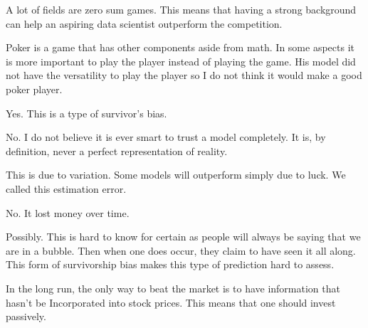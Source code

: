 \documentclass[12pt]{article}
\begin{document}
\begin{enumerate}
A lot of fields are zero sum games. This means that having a  strong background can help an aspiring data scientist outperform the competition. 



Poker is a game that has other components aside from math. In some aspects it is more important to play the player instead of playing the game. His model did not have the versatility to play the player so I do not think it would make a good poker player. 


Yes. This is a type of survivor's bias. 


No. I do not believe it is ever smart to trust a model completely. It is, by definition, never a perfect representation of reality. 


This is due to variation. Some models will outperform simply due to luck. We called this estimation error. 

No. It lost money over time. 

Possibly. This is hard to know for certain as people will always be saying that we are in a bubble. Then when one does occur, they claim to have seen it all along. This form of survivorship bias makes this type of prediction hard to assess. 


In the long run, the only way to beat the market is to have information that hasn't be Incorporated into stock prices. This means that one should invest passively.


\end{enumerate}
\end{document}
